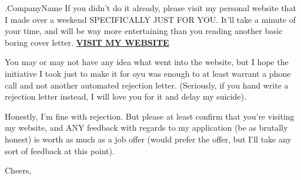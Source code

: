 \documentclass[10pt]{letter}
\begin{document}
\begin{letter}{
    {{ .CompanyName }}
}
If you didn't do it already, please visit my personal website that I made over a weekend SPECIFICALLY JUST FOR YOU. It'll take a minute of your time, and will be way more entertaining than you reading another basic boring cover letter. \textbf{\href{https://zabuzabuzaza.github.io/home/dear_recruiters/}{VISIT MY WEBSITE}}

You may or may not have any idea what went into the website, but I hope the initiative I took just to make it for oyu was enough to at least warrant a phone call and not another automated rejection letter. (Seriously, if you hand write a rejection letter instead, I will love you for it and delay my suicide). 

Honestly, I'm fine with rejection. But please at least confirm that you're visiting my website, and ANY feedback with regards to my application (be as brutally honest) is worth as much as a job offer (would prefer the offer, but I'll take any sort of feedback at this point).

\closing{Cheers,}

\end{letter}
\end{document}
